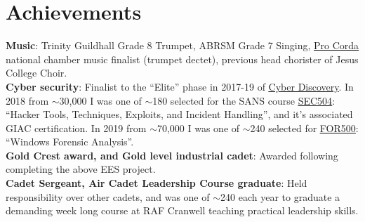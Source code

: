 \documentclass[letterpaper,11pt]{article}
\begin{document}
\section{Achievements}
 \begin{itemize}[leftmargin=0.15in, label={}]
    \small{\item{
     \textbf{Music}{: Trinity Guildhall Grade 8 Trumpet, ABRSM Grade 7 Singing, \href{https://procorda.com/}{\underline{Pro Corda}} national chamber music finalist (trumpet dectet), previous head chorister of Jesus College Choir.} \\
     \textbf{Cyber security}{: Finalist to the ``Elite'' phase in 2017-19 of \href{https://joincyberdiscovery.com/}{\underline{Cyber Discovery}}. In 2018 from $\sim$30,000 I was one of $\sim$180 selected for the SANS course \href{https://www.sans.org/cyber-security-courses/hacker-techniques-incident-handling/}{\underline{SEC504}}: ``Hacker Tools, Techniques, Exploits, and Incident Handling'', and it's associated GIAC certification. In 2019 from $\sim$70,000 I was one of $\sim$240 selected for \href{https://www.sans.org/cyber-security-courses/windows-forensic-analysis/}{\underline{FOR500}}: ``Windows Forensic Analysis''.} \\
     \textbf{Gold Crest award, and Gold level industrial cadet}{: Awarded following completing the above EES project.} \\
     \textbf{Cadet Sergeant, Air Cadet Leadership Course graduate}{: Held responsibility over other cadets, and was one of $\sim$240 each year to graduate a demanding week long course at RAF Cranwell teaching practical leadership skills.}
    }}
 \end{itemize}



%



\end{document}
